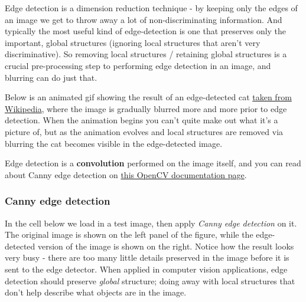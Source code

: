 \documentclass[11pt]{article}
\begin{document}
Edge detection is a dimension reduction technique - by keeping only the
edges of an image we get to throw away a lot of non-discriminating
information. And typically the most useful kind of edge-detection is one
that preserves only the important, global structures (ignoring local
structures that aren't very discriminative). So removing local
structures / retaining global structures is a crucial pre-processing
step to performing edge detection in an image, and blurring can do just
that.

Below is an animated gif showing the result of an edge-detected cat
\href{https://en.wikipedia.org/wiki/Gaussian_blur\#Common_uses}{taken
from Wikipedia}, where the image is gradually blurred more and more
prior to edge detection. When the animation begins you can't quite make
out what it's a picture of, but as the animation evolves and local
structures are removed via blurring the cat becomes visible in the
edge-detected image.

Edge detection is a \textbf{convolution} performed on the image itself,
and you can read about Canny edge detection on
\href{http://docs.opencv.org/2.4/doc/tutorials/imgproc/imgtrans/canny_detector/canny_detector.html}{this
OpenCV documentation page}.

    \hypertarget{canny-edge-detection}{%
\subsubsection{Canny edge detection}\label{canny-edge-detection}}

In the cell below we load in a test image, then apply \emph{Canny edge
detection} on it. The original image is shown on the left panel of the
figure, while the edge-detected version of the image is shown on the
right. Notice how the result looks very busy - there are too many little
details preserved in the image before it is sent to the edge detector.
When applied in computer vision applications, edge detection should
preserve \emph{global} structure; doing away with local structures that
don't help describe what objects are in the image.
\end{document}
